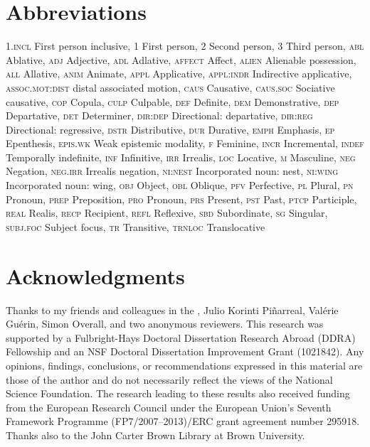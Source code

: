 \documentclass[output=paper]{LSP/langsci}
\begin{document}
\section*{ Abbreviations}
\textsc{1.incl}   First person inclusive,
1      First person,
2      Second person,
3      Third person,
\textsc{abl}      Ablative,
\textsc{adj}      Adjective,
\textsc{adl}      Adlative,
\textsc{affect}      Affect,
\textsc{alien}      Alienable possession,
\textsc{all}      Allative,
\textsc{anim}      Animate,
\textsc{appl}      Applicative,
\textsc{appl:indr}    Indirective applicative,
\textsc{assoc.mot:dist}  distal associated motion,
\textsc{caus}      Causative,
\textsc{caus.soc}    Sociative causative,
\textsc{cop}      Copula,
\textsc{culp}      Culpable,
\textsc{def}      Definite,
\textsc{dem}      Demonstrative,
\textsc{dep}      Departative,
\textsc{det}      Determiner,
\textsc{dir:dep}    Directional: departative,
\textsc{dir:reg}    Directional: regressive,
\textsc{dstr}      Distributive,
\textsc{dur}      Durative,
\textsc{emph}      Emphasis,
\textsc{ep}      Epenthesis,
\textsc{epis.wk}    Weak epistemic modality,
\textsc{f}      Feminine,
\textsc{incr}      Incremental,
\textsc{indef}      Temporally indefinite,
\textsc{inf}      Infinitive,
\textsc{irr}      Irrealis,
\textsc{loc}      Locative,
\textsc{m}      Masculine,
\textsc{neg}      Negation,
\textsc{neg.irr} Irrealis negation,
\textsc{ni:nest}   Incorporated noun: nest,
\textsc{ni:wing}    Incorporated noun: wing,
\textsc{obj}      Object,
\textsc{obl}      Oblique,
\textsc{pfv}      Perfective,
\textsc{pl}      Plural,
\textsc{pn}      Pronoun,
\textsc{prep}      Preposition,
\textsc{pro}      Pronoun,
\textsc{prs}      Present,
\textsc{pst}      Past,
\textsc{ptcp}      Participle,
\textsc{real}      Realis,
\textsc{recp}      Recipient,
\textsc{refl}      Reflexive,
\textsc{sbd}      Subordinate,
\textsc{sg}      Singular,
\textsc{subj.foc}    Subject focus,
\textsc{tr}      Transitive,
\textsc{trnloc}     Translocative

\section*{ Acknowledgments}
Thanks to my  friends and colleagues in the , Julio Korinti Piñarreal, Valérie Guérin, Simon Overall, and two anonymous reviewers. This research was supported by a Fulbright-Hays Doctoral Dissertation Research Abroad (DDRA) Fellowship and an NSF Doctoral Dissertation Improvement Grant (1021842). Any opinions, findings, conclusions, or recommendations expressed in this material are those of the author and do not necessarily reflect the views of the National Science Foundation. The research leading to these results also received funding from the European Research Council under the European Union’s Seventh Framework Programme (FP7/2007–2013)/ERC grant agreement number 295918. Thanks also to the John Carter Brown Library at Brown University.
%


\printbibliography[heading=subbibliography,notkeyword=this] 
\end{document}
